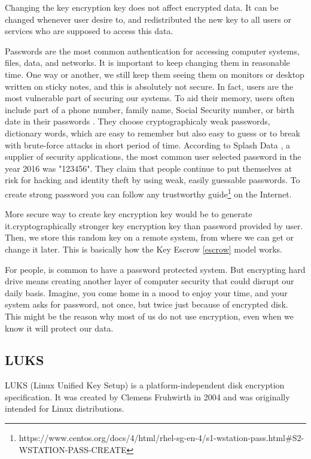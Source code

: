 Changing the key encryption key does not affect encrypted data.
It can be changed whenever user desire to, and redistributed the new key to all users or services who are supposed to access this data.

Passwords are the most common authentication for accessing computer systems, files, data, and networks.
It is important to keep changing them in reasonable time.
One way or another, we still keep them seeing them on monitors or desktop written on sticky notes, and this is absolutely not secure.
In fact, users are the most vulnerable part of securing our systems.
To aid their memory, users often include part of a phone number, family name, Social Security number, or birth date in their passwords \cite{pwdsec}.
They choose cryptographicaly weak passwords, dictionary words, which are easy to remember but also easy to guess or to break with brute-force attacks in short period of time.
According to Splash Data \cite{splashdata}, a supplier of security applications, the most common user selected password in the year 2016 was "123456".
They claim that people continue to put themselves at risk for hacking and identity theft by using weak, easily guessable passwords.
To create strong password you can follow any trustworthy guide\footnote{https://www.centos.org/docs/4/html/rhel-sg-en-4/s1-wstation-pass.html\#S2-WSTATION-PASS-CREATE} on the Internet.

More secure way to create key encryption key would be to generate it.cryptographically stronger key encryption key than password provided by user.
Then, we store this random key on a remote system, from where we can get or change it later.
This is basically how the Key Escrow \ref{escrow} model works.

For people, is common to have a password protected system.
But encrypting hard drive means creating another layer of computer security that could disrupt our daily basis.
Imagine, you come home in a mood to enjoy your time, and your system asks for password, not once, but twice just because of encrypted disk.
This might be the reason why most of us do not use encryption, even when we know it will protect our data.

\subsection{LUKS}

LUKS (Linux Unified Key Setup) is a platform-independent disk encryption specification.
It was created by Clemens Fruhwirth in 2004 and was originally intended for Linux distributions.

